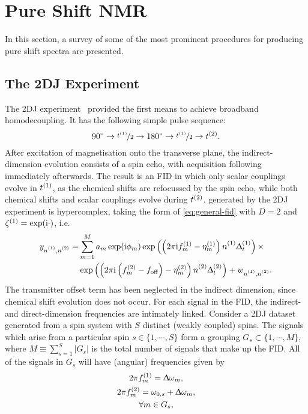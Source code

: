 \section{Pure Shift \acs{NMR}}
In this section, a survey of some of the most prominent procedures for
producing pure shift spectra are presented.
\subsection{The \acs{2DJ} Experiment}
The \ac{2DJ} experiment~\cite{Aue1976, Morris2009} provided the first means to
achieve broadband homodecoupling. It has the following simple pulse sequence:
\[
    \ang{90} \rightarrow \nicefrac{t^{(1)}}{2} \rightarrow \ang{180} \rightarrow \nicefrac{t^{(1)}}{2} \rightarrow t^{(2)}.
\]
After excitation of magnetisation onto the transverse plane, the
indirect-dimension evolution consists of a spin echo, with acquisition
following
immediately afterwards. The result is an \ac{FID} in which only scalar
couplings evolve in $t^{(1)}$, as the chemical shifts are refocussed by the
spin echo, while both chemical shifts and scalar
couplings evolve during $t^{(2)}$.  generated by the \ac{2DJ}
experiment is hypercomplex, taking the form of \cref{eq:general-fid} with
$D=2$ and $\zeta^{(1)} = \exp(\mathrm{i}\cdot)$, i.e.
\begin{equation}%
    \begin{split}%
        y_{\none,\ntwo} =
        &\sum_{m=1}^{M} a_m \exp(\iu \phi_m)
            \exp\left(\left(2 \pi \iu \fonem - \etaonem\right) \none \Dtone\right) \times \\
        &\exp\left(\left(2 \pi \iu  \left(\ftwom - \foff\right)
            - \etatwom\right) \ntwo \Dttwo\right)
            + w_{\none,\ntwo}.
    \end{split}%
    \label{eq:jres-fid}%
\end{equation}%
The transmitter offset term has been neglected in the indirect dimension, since
chemical shift evolution does not occur.
For each signal in the \ac{FID}, the indirect- and direct-dimension
frequencies are intimately linked. Consider a \ac{2DJ} dataset generated from a
spin system with $S$ distinct (weakly coupled) spins. The signals which arise
from a particular spin $s \in \lbrace 1, \cdots, S \rbrace$ form a grouping $G_s
\subset \lbrace 1, \cdots, M \rbrace$, where $M \equiv \sum_{s=1}^S \lvert G_s
\rvert$ is the total number of signals that make up the \ac{FID}. All of the
signals in $G_s$ will have (angular) frequencies given by
\begin{subequations}
    \begin{gather}
        2 \pi f_m^{(1)} = \Updelta \omega_m,\\
        2 \pi f_m^{(2)} = \omega_{0,s} + \Updelta \omega_m,\\
        \forall m \in G_s\notag,
    \end{gather}%
    \label{eq:f1-f2-2dj}%
\end{subequations}
